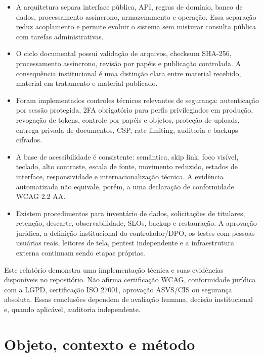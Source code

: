 \documentclass[11pt,a4paper]{article}
\begin{document}
\begin{itemize}
  \item A arquitetura separa interface pública, API, regras de domínio, banco de dados, processamento assíncrono, armazenamento e operação. Essa separação reduz acoplamento e permite evoluir o sistema sem misturar consulta pública com tarefas administrativas.
  \item O ciclo documental possui validação de arquivos, checksum SHA-256, processamento assíncrono, revisão por papéis e publicação controlada. A consequência institucional é uma distinção clara entre material recebido, material em tratamento e material publicado.
  \item Foram implementados controles técnicos relevantes de segurança: autenticação por sessão protegida, 2FA obrigatório para perfis privilegiados em produção, revogação de tokens, controle por papéis e objetos, proteção de uploads, entrega privada de documentos, CSP, rate limiting, auditoria e backups cifrados.
  \item A base de acessibilidade é consistente: semântica, skip link, foco visível, teclado, alto contraste, escala de fonte, movimento reduzido, estados de interface, responsividade e internacionalização técnica. A evidência automatizada não equivale, porém, a uma declaração de conformidade WCAG 2.2 AA.
  \item Existem procedimentos para inventário de dados, solicitações de titulares, retenção, descarte, observabilidade, SLOs, backup e restauração. A aprovação jurídica, a definição institucional do controlador/DPO, os testes com pessoas usuárias reais, leitores de tela, pentest independente e a infraestrutura externa continuam sendo etapas próprias.
\end{itemize}

\begin{attentionbox}[title=Limite da conclusão]
Este relatório demonstra uma implementação técnica e suas evidências disponíveis no repositório. Não afirma certificação WCAG, conformidade jurídica com a LGPD, certificação ISO 27001, aprovação ASVS/CIS ou segurança absoluta. Essas conclusões dependem de avaliação humana, decisão institucional e, quando aplicável, auditoria independente.
\end{attentionbox}

\section{Objeto, contexto e método}
\end{document}
